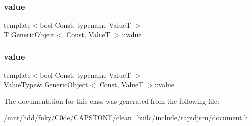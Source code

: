 \subsubsection{\texorpdfstring{value}{value}}
{\footnotesize\ttfamily template$<$bool Const, typename ValueT $>$ \\
T \hyperlink{classGenericObject}{Generic\+Object}$<$ Const, ValueT $>$\+::\hyperlink{imgui__impl__opengl3__loader_8h_a32aff7c6c4cd253fdf6563677afab5ce}{value}}

\mbox{\label{classGenericObject_a2578a62ca4786f6fb056400138623473}} 
\subsubsection{\texorpdfstring{value\+\_\+}{value\_}}
{\footnotesize\ttfamily template$<$bool Const, typename ValueT $>$ \\
\hyperlink{classGenericObject_a930aa30f89caee7ba7bff60bf9dc21b1}{Value\+Type}\& \hyperlink{classGenericObject}{Generic\+Object}$<$ Const, ValueT $>$\+::value\+\_\+\hspace{0.3cm}{\ttfamily [private]}}



The documentation for this class was generated from the following file\+:\begin{DoxyCompactItemize}
\item 
/mnt/hdd/fnky/\+C0de/\+C\+A\+P\+S\+T\+O\+N\+E/clean\+\_\+build/include/rapidjson/\hyperlink{document_8h}{document.\+h}\end{DoxyCompactItemize}
